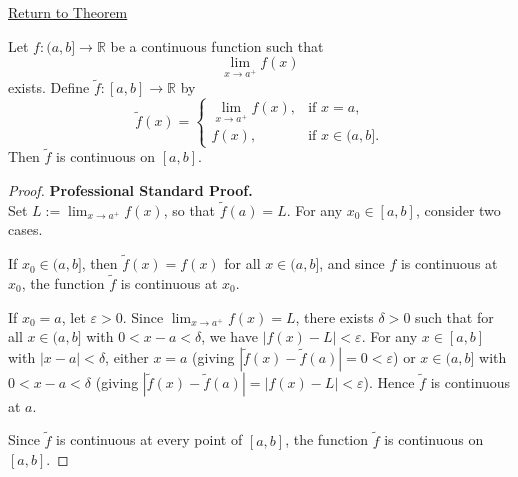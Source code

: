 \newpage
{}
\label{prf:continuous-extension-closed-interval}

\begin{remark*}[Return]
\hyperref[prop:continuous-extension-closed-interval]{Return to Theorem}
\end{remark*}

\begin{theorem*}
Let $f:(a,b]\to\mathbb{R}$ be a continuous function such that
\[
  \lim_{x\to a^+} f(x)
\]
exists.
Define $\widetilde{f}:[a,b]\to\mathbb{R}$ by
\[
  \widetilde{f}(x)=
  \begin{cases}
    \lim_{x\to a^+} f(x), & \text{if } x=a,\\[4pt]
    f(x), & \text{if } x\in(a,b].
  \end{cases}
\]
Then $\widetilde{f}$ is continuous on $[a,b]$.
\end{theorem*}

\begin{proof}
\textbf{Professional Standard Proof.}~\\
Set $L := \lim_{x\to a^+} f(x)$, so that $\widetilde{f}(a) = L$. For any $x_0 \in [a,b]$, consider two cases.

If $x_0 \in (a,b]$, then $\widetilde{f}(x) = f(x)$ for all $x \in (a,b]$, and since $f$ is continuous at $x_0$, the function $\widetilde{f}$ is continuous at $x_0$.

If $x_0 = a$, let $\varepsilon > 0$. Since $\lim_{x\to a^+} f(x) = L$, there exists $\delta > 0$ such that for all $x \in (a,b]$ with $0 < x - a < \delta$, we have $|f(x) - L| < \varepsilon$. For any $x \in [a,b]$ with $|x - a| < \delta$, either $x = a$ (giving $|\widetilde{f}(x) - \widetilde{f}(a)| = 0 < \varepsilon$) or $x \in (a,b]$ with $0 < x - a < \delta$ (giving $|\widetilde{f}(x) - \widetilde{f}(a)| = |f(x) - L| < \varepsilon$). Hence $\widetilde{f}$ is continuous at $a$.

Since $\widetilde{f}$ is continuous at every point of $[a,b]$, the function $\widetilde{f}$ is continuous on $[a,b]$.
\end{proof}

